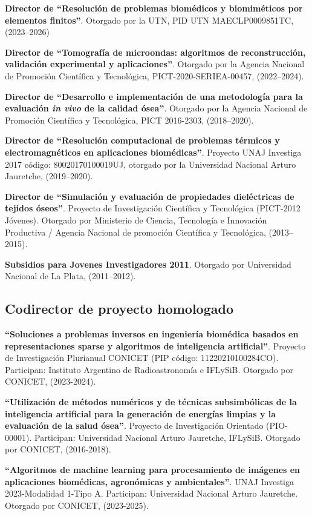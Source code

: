 \documentclass[margin,line]{res}
\begin{document}
\begin{resume}
\textbf{Director de ``Resolución de problemas biomédicos y biomiméticos por elementos finitos''}. Otorgado por la UTN, PID UTN MAECLP0009851TC, (2023--2026)

\textbf{Director de ``Tomografía de microondas: algoritmos de reconstrucción, validación experimental y aplicaciones''}. Otorgado por la Agencia Nacional de Promoción Científica y Tecnológica, PICT-2020-SERIEA-00457, (2022--2024).

\textbf{Director de ``Desarrollo e implementación de una metodología para la evaluación \textit{in vivo} de la calidad ósea''}. Otorgado por la Agencia Nacional de Promoción Científica y Tecnológica, PICT 2016-2303, (2018--2020).

\textbf{Director de ``Resolución computacional de problemas térmicos y electromagnéticos en aplicaciones biomédicas''}. Proyecto UNAJ Investiga 2017 código: 80020170100019UJ, otorgado por la Universidad Nacional Arturo Jauretche, (2019--2020).

\textbf{Director de ``Simulación y evaluación de propiedades dieléctricas de tejidos óseos''}. Proyecto de Investigación Científica y Tecnológica (PICT-2012 Jóvenes). Otorgado por Ministerio de Ciencia, Tecnología e Innovación Productiva / Agencia Nacional de promoción Científica y Tecnológica, (2013--2015).

\textbf{Subsidios para Jovenes Investigadores 2011}. Otorgado por Universidad Nacional de La Plata, (2011--2012).

\subsection{ Codirector de proyecto homologado}

\textbf{``Soluciones a problemas inversos en ingeniería biomédica basados en representaciones sparse y algoritmos de inteligencia artificial''}. Proyecto de Investigación Plurianual CONICET (PIP código: 11220210100284CO). Participan: Instituto Argentino de Radioastronomía e IFLySiB. Otorgado por CONICET, (2023-2024).

\textbf{``Utilización de métodos numéricos y de técnicas subsimbólicas de la inteligencia artificial para la generación de energías  limpias y la evaluación de la salud ósea''}. Proyecto de Investigación Orientado (PIO-00001). Participan: Universidad Nacional Arturo Jauretche, IFLySiB. Otorgado por CONICET, (2016-2018).

\textbf{``Algoritmos de machine learning para procesamiento de imágenes en aplicaciones biomédicas, agronómicas y ambientales''}. UNAJ Investiga 2023-Modalidad 1-Tipo A. Participan: Universidad Nacional Arturo Jauretche. Otorgado por CONICET, (2023-2025).


\end{resume}
\end{document}
